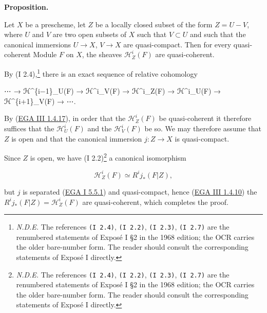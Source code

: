 \documentclass[
  11pt,
  a4paper,
]{book}
\newenvironment{Shaded}{}{}
\newcommand{\NormalTok}[1]{#1}
\begin{document}
\textbf{Proposition.}

Let \(X\) be a prescheme, let \(Z\) be a locally closed subset of the
form \(Z = U - V\), where \(U\) and \(V\) are two open subsets of \(X\)
such that \(V \subset U\) and such that the canonical immersions
\(U \to X\), \(V \to X\) are quasi-compact. Then for every
quasi-coherent Module \(F\) on \(X\), the sheaves
\(\mathcal{H}^{i}_{Z}(F)\) are quasi-coherent.

By (I 2.4),\footnote{\emph{N.D.E.} The references \texttt{(I\ 2.4)},
  \texttt{(I\ 2.2)}, \texttt{(I\ 2.3)}, \texttt{(I\ 2.7)} are the
  renumbered statements of Exposé I §2 in the 1968 edition; the OCR
  carries the older bare-number form. The reader should consult the
  corresponding statements of Exposé I directly.} there is an exact
sequence of relative cohomology

\begin{Shaded}
\begin{Highlighting}[]
\NormalTok{⋯ → ℋ\^{}\{i−1\}\_U(F) → ℋ\^{}i\_V(F) → ℋ\^{}i\_Z(F) → ℋ\^{}i\_U(F) → ℋ\^{}\{i+1\}\_V(F) → ⋯.}
\end{Highlighting}
\end{Shaded}

By
(\href{https://jcreinhold.github.io/ega/iii/08-ch3-01-cohomology-affine-schemes.html\#14-application-to-the-cohomology-of-arbitrary-preschemes}{EGA
III 1.4.17}), in order that the \(\mathcal{H}^{i}_{Z}(F)\) be
quasi-coherent it therefore suffices that the \(\mathcal{H}^{i}_{U}(F)\)
and the \(\mathcal{H}^{i}_{V}(F)\) be so. We may therefore assume that
\(Z\) is open and that the canonical immersion \(j: Z \to X\) is
quasi-compact.

Since \(Z\) is open, we have (I 2.2)\footnote{\emph{N.D.E.} The
  references \texttt{(I\ 2.4)}, \texttt{(I\ 2.2)}, \texttt{(I\ 2.3)},
  \texttt{(I\ 2.7)} are the renumbered statements of Exposé I §2 in the
  1968 edition; the OCR carries the older bare-number form. The reader
  should consult the corresponding statements of Exposé I directly.} a
canonical isomorphism

\[ \mathcal{H}^{i}_{Z}(F) \simeq R^{i} j_{*}(F|Z), \]

but \(j\) is separated
(\href{https://jcreinhold.github.io/ega/i/01-05-reduced-preschemes-and-separation.html\#55-separation-criteria}{EGA
I 5.5.1}) and quasi-compact, hence
(\href{https://jcreinhold.github.io/ega/iii/08-ch3-01-cohomology-affine-schemes.html\#14-application-to-the-cohomology-of-arbitrary-preschemes}{EGA
III 1.4.10}) the \(R^{i} j_{*}(F|Z) =
\mathcal{H}^{i}_{Z}(F)\) are quasi-coherent, which completes the proof.
\end{document}
